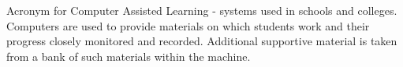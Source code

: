 Acronym for Computer Assisted Learning - systems used 
in schools and colleges.  Computers are used to provide 
materials on which students work and their progress closely
monitored and recorded. Additional supportive material is 
taken from a bank of such materials within the machine.